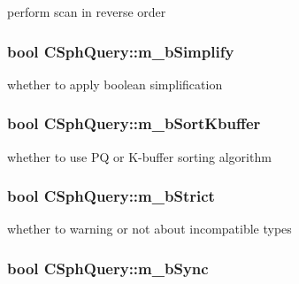 perform scan in reverse order 

\hypertarget{classCSphQuery_ac3dddf973cfef68ecdb4ce81f3120312}{
\subsubsection[{m\-\_\-b\-Simplify}]{\setlength{\rightskip}{0pt plus 5cm}bool C\-Sph\-Query\-::m\-\_\-b\-Simplify}}\label{classCSphQuery_ac3dddf973cfef68ecdb4ce81f3120312}


whether to apply boolean simplification 

\hypertarget{classCSphQuery_a1231bf2abf4df49e559d9288e4bb02f1}{
\subsubsection[{m\-\_\-b\-Sort\-Kbuffer}]{\setlength{\rightskip}{0pt plus 5cm}bool C\-Sph\-Query\-::m\-\_\-b\-Sort\-Kbuffer}}\label{classCSphQuery_a1231bf2abf4df49e559d9288e4bb02f1}


whether to use P\-Q or K-\/buffer sorting algorithm 

\hypertarget{classCSphQuery_a30bb3c386034e7a14c6599439d378d19}{
\subsubsection[{m\-\_\-b\-Strict}]{\setlength{\rightskip}{0pt plus 5cm}bool C\-Sph\-Query\-::m\-\_\-b\-Strict}}\label{classCSphQuery_a30bb3c386034e7a14c6599439d378d19}


whether to warning or not about incompatible types 

\hypertarget{classCSphQuery_a7e09b2bec22311e40299abc8220e794f}{
\subsubsection[{m\-\_\-b\-Sync}]{\setlength{\rightskip}{0pt plus 5cm}bool C\-Sph\-Query\-::m\-\_\-b\-Sync}}\label{classCSphQuery_a7e09b2bec22311e40299abc8220e794f}


